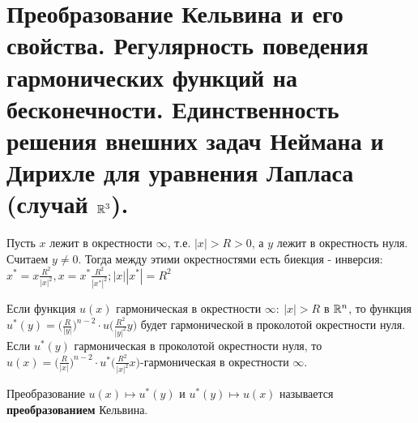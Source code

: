 \section{Преобразование Кельвина и его свойства. Регулярность поведения гармонических функций на бесконечности. Единственность решения внешних задач Неймана и Дирихле для уравнения Лапласа (случай $\mathbb{R}^3$).}
Пусть $x$ лежит в окрестности $\infty$, т.е. $|x|>R>0$, а $y$ лежит в окрестность нуля. Считаем $y \neq 0.$ Тогда между этими окрестностями есть биекция - инверсия:
$x^*=x \frac{R^2}{|x|^2},x=x^* \frac{R^2}{|x^*|^2}; |x||x^*|=R^2 $
\begin{lemma}
Если функция $u(x)$ гармоническая в окрестности $\infty: \ |x|>R$ в $\mathbb{R}^n$, то функция $u^*(y)= \big(\frac{R}{|y|}\big)^{n-2}\cdot u(\frac{R^2}{|y|^2} y\big)$ будет гармонической в проколотой окрестности нуля. Если $u^*(y)$ гармоническая в проколотой окрестности нуля, то $u(x)= \big(\frac{R}{|x|}\big)^{n-2}\cdot u^*(\frac{R^2}{|x|^2} x\big)$-гармоническая в окрестности $\infty$.
\end{lemma}
\begin{definition}
Преобразование $u(x) \longmapsto u^*(y)$ и $u^*(y) \longmapsto u(x)$ называется \textbf{преобразованием} Кельвина.
\end{definition}

